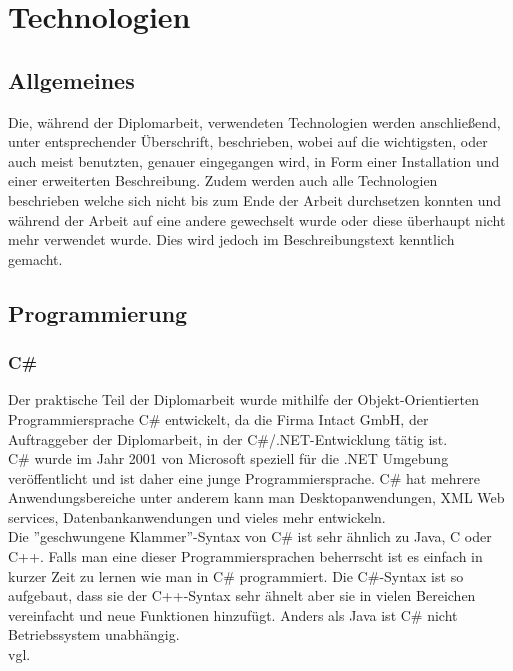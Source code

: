 \renewcommand{\theauthor}{Dario Wagner}
\chapter{Technologien}
\label{sec:Technologien}
\section{Allgemeines}
\label{sec:TechnologieAllgemeines}
Die, während der Diplomarbeit, verwendeten Technologien werden anschließend, unter entsprechender Überschrift, beschrieben, wobei auf die wichtigsten, oder auch meist benutzten, genauer eingegangen wird, in Form einer Installation und einer erweiterten Beschreibung. Zudem werden auch alle Technologien beschrieben welche sich nicht bis zum Ende der Arbeit durchsetzen konnten und während der Arbeit auf eine andere gewechselt wurde oder diese überhaupt nicht mehr verwendet wurde. Dies wird jedoch im Beschreibungstext kenntlich gemacht.
\section{Programmierung}
\label{sec:TechnologieProgrammierung}
\subsection{C\#}
\label{sec:CSharp}
Der praktische Teil der Diplomarbeit wurde mithilfe der Objekt-Orientierten Programmiersprache C\# entwickelt, da die Firma Intact GmbH, der Auftraggeber der Diplomarbeit, in der C\#/.NET-Entwicklung tätig ist. \\ \break
C\# wurde im Jahr 2001 von Microsoft speziell für die .NET Umgebung veröffentlicht und ist daher eine junge Programmiersprache. C\# hat mehrere Anwendungsbereiche unter anderem kann man Desktopanwendungen, XML Web services, Datenbankanwendungen und vieles mehr entwickeln. \\ \break
Die ''geschwungene Klammer''-Syntax von C\# ist sehr ähnlich zu Java, C oder C++. Falls man eine dieser Programmiersprachen beherrscht ist es einfach in kurzer Zeit zu lernen wie man in C\# programmiert. Die C\#-Syntax ist so aufgebaut, dass sie der C++-Syntax sehr ähnelt aber sie in vielen Bereichen vereinfacht und neue Funktionen hinzufügt. Anders als Java ist C\# nicht Betriebssystem unabhängig. \\vgl. \cite{TechnologieCSharpErklaerung} 
